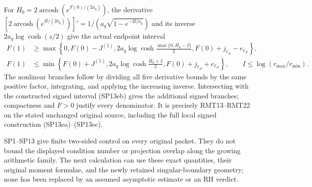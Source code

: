 For $H_0=2\operatorname{arcosh}(e^{F(0)/(2a_q)})$, the derivative
$[2\operatorname{arcosh}(e^{B/(2a_q)})]'
=1/(a_q\sqrt{1-e^{-B/a_q}})$ and its inverse
$2a_q\log\cosh(z/2)$ give the actual endpoint interval
\[
 \begin{aligned}
 F(1)&\ge\max\left\{0,F(0)-J^{(5)},
 2a_q\log\cosh\frac{\max\{0,H_0-I\}}2,F(0)+j_{\ell_N}-e_{\ell_N}\right\},\\
 F(1)&\le\min\left\{F(0)+J^{(5)},
 2a_q\log\cosh\frac{H_0+I}2,F(0)+j_{\ell_N}+e_{\ell_N}\right\},
 \qquad I\le\log(r_{\max}/r_{\min}).
 \end{aligned}
 \tag{SP13c}
\]
The nonlinear branches follow by dividing all five derivative bounds
by the same positive factor, integrating, and applying the increasing
inverse. Intersecting with the constructed signed interval (SP13eb)
gives the additional signed branches;
compactness and $F>0$ justify every denominator. It is precisely
RMT13--RMT22 on the stated unchanged original source, including
the full local signed construction (SP13ea)--(SP13ec).

SP1--SP13 give finite two-sided control on every original packet.
They do not bound the displayed condition number or projection
overlap along the growing arithmetic family. The next calculation
can use these exact quantities, their original moment formulae,
and the newly retained singular-boundary geometry; none has been
replaced by an assumed asymptotic estimate or an RH verdict.
